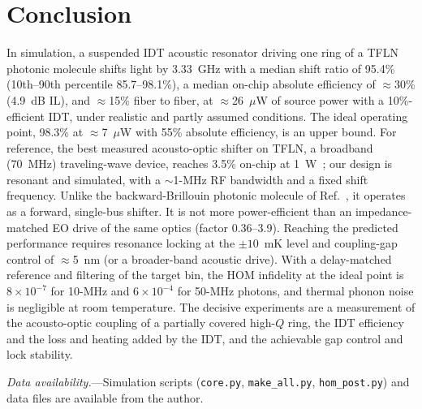 \documentclass[aps,prapplied,reprint,superscriptaddress,amsmath,amssymb,floatfix]{revtex4-2}
\begin{document}
\section{Conclusion}
In simulation, a suspended IDT acoustic resonator driving one ring of a TFLN photonic molecule shifts light by 3.33~GHz with a median shift ratio of 95.4\% (10th--90th percentile 85.7--98.1\%), a median on-chip absolute efficiency of $\approx$30\% (4.9~dB IL), and $\approx$15\% fiber to fiber, at $\approx$26~$\mu$W of source power with a 10\%-efficient IDT, under realistic and partly assumed conditions. The ideal operating point, 98.3\% at $\approx$7~$\mu$W with 55\% absolute efficiency, is an upper bound. For reference, the best measured acousto-optic shifter on TFLN, a broadband (70~MHz) traveling-wave device, reaches 3.5\% on-chip at 1~W~\cite{Shao2020}; our design is resonant and simulated, with a $\sim$1-MHz RF bandwidth and a fixed shift frequency. Unlike the backward-Brillouin photonic molecule of Ref.~\cite{Zhu2025ao}, it operates as a forward, single-bus shifter. It is not more power-efficient than an impedance-matched EO drive of the same optics (factor 0.36--3.9). Reaching the predicted performance requires resonance locking at the $\pm10$~mK level and coupling-gap control of $\approx$5~nm (or a broader-band acoustic drive). With a delay-matched reference and filtering of the target bin, the HOM infidelity at the ideal point is $8\times10^{-7}$ for 10-MHz and $6\times10^{-4}$ for 50-MHz photons, and thermal phonon noise is negligible at room temperature. The decisive experiments are a measurement of the acousto-optic coupling of a partially covered high-$Q$ ring, the IDT efficiency and the loss and heating added by the IDT, and the achievable gap control and lock stability.

\emph{Data availability.}---Simulation scripts (\texttt{core.py}, \texttt{make\_all.py}, \texttt{hom\_post.py}) and data files are available from the author.


\end{document}
